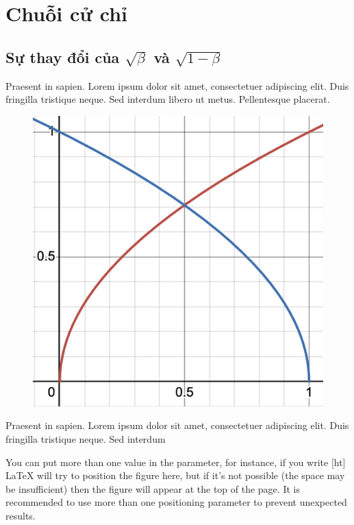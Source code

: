 \appendix

\chapter{Chuỗi cử chỉ}

\section{Sự thay đổi của $\sqrt{\beta}$ và $\sqrt{1-\beta}$}

Praesent in sapien. Lorem ipsum dolor sit amet, consectetuer 
adipiscing elit. Duis fringilla tristique neque. Sed interdum 
libero ut metus. Pellentesque placerat.


\begin{figure}
	\includegraphics[width=0.9\linewidth]{images/beta_sqrtbeta}
	\label{fig:wrapfig}
\end{figure}

Praesent in sapien. Lorem ipsum dolor sit amet, consectetuer 
adipiscing elit. Duis fringilla tristique neque. Sed interdum



You can put more than one value in the parameter, for instance, if you write [ht] LaTeX will try to position the figure here, but if it's not possible (the space may be insufficient) then the figure will appear at the top of the page. It is recommended to use more than one positioning parameter to prevent unexpected results.
